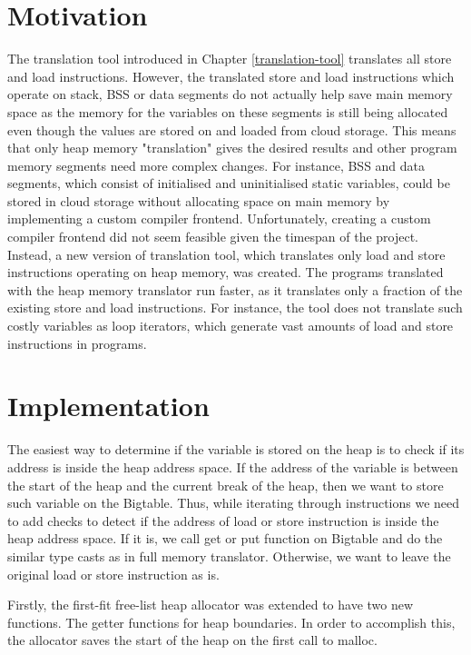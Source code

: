 \documentclass[bsc,frontabs,twoside,singlespacing,parskip,deptreport]{infthesis}     %
\begin{document}
\section{Motivation}

The translation tool introduced in Chapter \ref{translation-tool} translates all store and load instructions. However, the translated store and load instructions which operate on stack, BSS or data segments do not actually help save main memory space as the memory for the variables on these segments is still being allocated even though the values are stored on and loaded from cloud storage. This means that only heap memory "translation" gives the desired results and other program memory segments need more complex changes. For instance, BSS and data segments, which consist of initialised and uninitialised static variables, could be stored in cloud storage without allocating space on main memory by implementing a custom compiler frontend. Unfortunately, creating a custom compiler frontend did not seem feasible given the timespan of the project. Instead, a new version of translation tool, which translates only load and store instructions operating on heap memory, was created. The programs translated with the heap memory translator run faster, as it translates only a fraction of the existing store and load instructions. For instance, the tool does not translate such costly variables as loop iterators, which generate vast amounts of load and store instructions in programs.

\section{Implementation}

The easiest way to determine if the variable is stored on the heap is to check if its address is inside the heap address space. If the address of the variable is between the start of the heap and the current break of the heap, then we want to store such variable on the Bigtable. Thus, while iterating through instructions we need to add checks to detect if the address of load or store instruction is inside the heap address space. If it is, we call get or put function on Bigtable and do the similar type casts as in full memory translator. Otherwise, we want to leave the original load or store instruction as is. 

Firstly, the first-fit free-list heap allocator was extended to have two new functions. The getter functions for heap boundaries. In order to accomplish this, the allocator saves the start of the heap on the first call to malloc.
\end{document}
